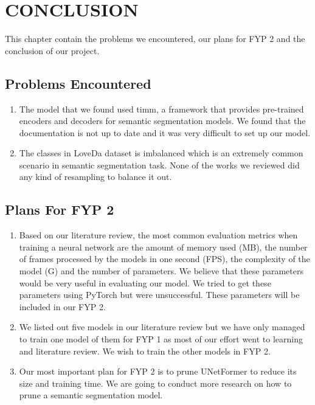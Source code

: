 \chapter{CONCLUSION}

This chapter contain the problems we encountered, our plans for FYP 2 and the conclusion of our project.

\section{Problems Encountered}
\begin{enumerate}
    \item The model that we found used timm, a framework that provides pre-trained encoders and decoders for semantic segmentation models. We found that the documentation is not up to date and it was very difficult to set up our model.

    \item The classes in LoveDa dataset is imbalanced which is an extremely common scenario in semantic segmentation task. None of the works we reviewed did any kind of resampling to balance it out.
\end{enumerate}
\section{Plans For FYP 2}
\begin{enumerate}
    \item Based on our literature review, the most common evaluation metrics when training a neural network are the amount of memory used (MB), the number of frames processed by the models in one second (FPS), the complexity of the model (G) and the number of parameters. We believe that these parameters would be very useful in evaluating our model. We tried to get these parameters using PyTorch but were unsuccessful. These parameters will be included in our FYP 2.

    \item We listed out five models in our literature review but we have only managed to train one model of them for FYP 1 as most of our effort went to learning and literature review. We wish to train the other models in FYP 2.

    \item Our most important plan for FYP 2 is to prune UNetFormer to reduce its size and training time. We are going to conduct more research on how to prune a semantic segmentation model. 
\end{enumerate}
